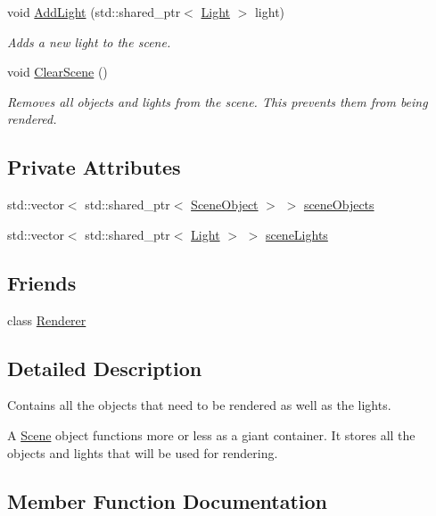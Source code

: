 \begin{DoxyCompactItemize}
void \hyperlink{class_scene_ab9b1a906b16bf867600fc3f5b734c1d4}{Add\+Light} (std\+::shared\+\_\+ptr$<$ \hyperlink{class_light}{Light} $>$ light)
\begin{DoxyCompactList}\small\item\em Adds a new light to the scene. \end{DoxyCompactList}\item 
void \hyperlink{class_scene_ac3b0f6126be07f78a61abfac3487e4df}{Clear\+Scene} ()
\begin{DoxyCompactList}\small\item\em Removes all objects and lights from the scene. This prevents them from being rendered. \end{DoxyCompactList}\end{DoxyCompactItemize}
\subsection*{Private Attributes}
\begin{DoxyCompactItemize}
\item 
std\+::vector$<$ std\+::shared\+\_\+ptr$<$ \hyperlink{class_scene_object}{Scene\+Object} $>$ $>$ \hyperlink{class_scene_a871382922b2a04d7883cf6d34529b5df}{scene\+Objects}
\item 
std\+::vector$<$ std\+::shared\+\_\+ptr$<$ \hyperlink{class_light}{Light} $>$ $>$ \hyperlink{class_scene_a847f4f9c485a56b084a1340811f0e726}{scene\+Lights}
\end{DoxyCompactItemize}
\subsection*{Friends}
\begin{DoxyCompactItemize}
\item 
class \hyperlink{class_scene_a70538530bc36e033e360880ef311df61}{Renderer}
\end{DoxyCompactItemize}


\subsection{Detailed Description}
Contains all the objects that need to be rendered as well as the lights. 

A \hyperlink{class_scene}{Scene} object functions more or less as a giant container. It stores all the objects and lights that will be used for rendering. 

\subsection{Member Function Documentation}
\hypertarget{class_scene_ab9b1a906b16bf867600fc3f5b734c1d4}{}\label{class_scene_ab9b1a906b16bf867600fc3f5b734c1d4} 
